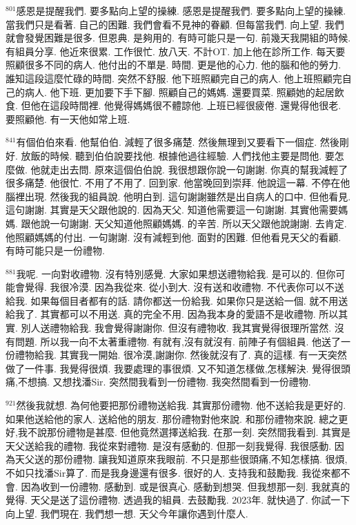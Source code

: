 \documentclass{book}
\begin{document}
$^{801}$感恩是提醒我們.
要多點向上望的操練.
感恩是提醒我們.
要多點向上望的操練.
當我們只是看著.
自己的困難.
我們會看不見神的眷顧.
但每當我們.
向上望.
我們就會發覺困難是很多.
但恩典.
是夠用的.
有時可能只是一句.
前幾天我開組的時候.
有組員分享.
他近來很累.
工作很忙.
放八天.
不計OT.
加上他在診所工作.
每天要照顧很多不同的病人.
他付出的不單是.
時間.
更是他的心力.
他的腦和他的勞力.
誰知這段這麼忙碌的時間.
突然不舒服.
他下班照顧完自己的病人.
他上班照顧完自己的病人.
他下班.
更加要下手下腳.
照顧自己的媽媽.
還要買菜.
照顧她的起居飲食.
但他在這段時間裡.
他覺得媽媽很不體諒他.
上班已經很疲倦.
還覺得他很老.
要照顧他.
有一天他如常上班.

$^{841}$有個伯伯來看.
他幫伯伯.
減輕了很多痛楚.
然後無理到又要看下一個症.
然後剛好.
放飯的時候.
聽到伯伯說要找他.
根據他過往經驗.
人們找他主要是問他.
要怎麼做.
他就走出去問.
原來這個伯伯說.
我很想跟你說一句謝謝.
你真的幫我減輕了很多痛楚.
他很忙.
不用了不用了.
回到家.
他當晚回到崇拜.
他說這一幕.
不停在他腦裡出現.
然後我的組員說.
他明白到.
這句謝謝雖然是出自病人的口中.
但他看見.
這句謝謝.
其實是天父跟他說的.
因為天父.
知道他需要這一句謝謝.
其實他需要媽媽.
跟他說一句謝謝.
天父知道他照顧媽媽.
的辛苦.
所以天父跟他說謝謝.
去肯定.
他照顧媽媽的付出.
一句謝謝.
沒有減輕到他.
面對的困難.
但他看見天父的看顧.
有時可能只是一份禮物.

$^{881}$我呢.
一向對收禮物.
沒有特別感覺.
大家如果想送禮物給我.
是可以的.
但你可能會覺得.
我很冷漠.
因為我從來.
從小到大.
沒有送和收禮物.
不代表你可以不送給我.
如果每個目者都有的話.
請你都送一份給我.
如果你只是送給一個.
就不用送給我了.
其實都可以不用送.
真的完全不用.
因為我本身的愛語不是收禮物.
所以其實.
別人送禮物給我.
我會覺得謝謝你.
但沒有禮物收.
我其實覺得很理所當然.
沒有問題.
所以我一向不太著重禮物.
有就有,沒有就沒有.
前陣子有個組員.
他送了一份禮物給我.
其實我一開始.
很冷漠,謝謝你.
然後就沒有了.
真的這樣.
有一天突然做了一件事.
我覺得很煩.
我要處理的事很煩.
又不知道怎樣做,怎樣解決.
覺得很頭痛,不想搞.
又想找潘Sir.
突然間我看到一份禮物.
我突然間看到一份禮物.

$^{921}$然後我就想.
為何他要把那份禮物送給我.
其實那份禮物.
他不送給我是更好的.
如果他送給他的家人.
送給他的朋友.
那份禮物對他來說.
和那份禮物來說.
總之更好,我不說那份禮物是甚麼.
但他竟然選擇送給我.
在那一刻.
突然間我看到.
其實是天父送給我的禮物.
我從來對禮物.
是沒有感動的.
但那一刻我覺得.
我很感動.
因為天父送的那份禮物.
讓我知道原來我眼前.
不只是那些很頭痛,不知怎樣搞.
很煩,不如只找潘Sir算了.
而是我身邊還有很多.
很好的人.
支持我和鼓勵我.
我從來都不會.
因為收到一份禮物.
感動到.
或是很真心.
感動到想哭.
但我想那一刻.
我就真的覺得.
天父是送了這份禮物.
透過我的組員.
去鼓勵我.
2023年.
就快過了.
你試一下向上望.
我們現在.
我們想一想.
天父今年讓你遇到什麼人.
\end{document}
